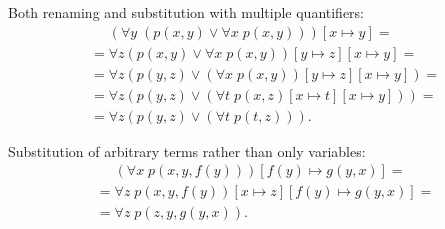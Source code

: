 \begin{example}
\begin{ExEnum}
     Both renaming and substitution with multiple quantifiers:
    \begin{align*}
      &\phantom{{}={}}
      (\forall y\; (p(x, y) \vee \forall x\; p(x, y)))[x \mapsto y]
      = \\ &=
      \forall z (p(x, y) \vee \forall x\; p(x, y))[y \mapsto z][x \mapsto y]
      = \\ &=
      \forall z (p(y, z) \vee (\forall x\; p(x, y))[y \mapsto z][x \mapsto y])
      = \\ &=
      \forall z (p(y, z) \vee (\forall t\; p(x, z)[x \mapsto t][x \mapsto y]))
      = \\ &=
      \forall z (p(y, z) \vee (\forall t\; p(t, z))).
    \end{align*}

     Substitution of arbitrary terms rather than only variables:
    \begin{align*}
      &\phantom{{}={}}
      (\forall x\; p(x, y, f(y)))[f(y) \mapsto g(y, x)]
      = \\ &=
      \forall z\; p(x, y, f(y))[x \mapsto z][f(y) \mapsto g(y, x)]
      = \\ &=
      \forall z\; p(z, y, g(y, x)).
    \end{align*}
  \end{ExEnum}
\end{example}
